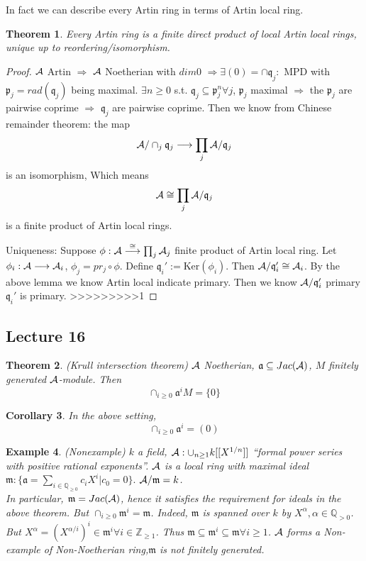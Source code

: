 \documentclass[11pt]{article}
\newtheorem{thm}{Theorem}[section]
\newtheorem{cor}[thm]{Corollary}
\newtheorem{ex}[thm]{Example}
\newcommand{\intg}{\mathbb Z}
\newcommand{\ratl}{\mathbb Q}
\newcommand{\sca}{{\mathfrak a}}
\newcommand{\scm}{{\mathfrak m}}
\newcommand{\scp}{{\mathfrak p}}
\newcommand{\scq}{\mathfrak q}
\newcommand{\cala}{{\cal A}}
\newcommand{\Lrta}{\Longrightarrow}
\newcommand{\lrta}{\longrightarrow}
\begin{document}
In fact we can describe every Artin ring in terms of Artin local ring.
\begin{thm}\label{thm:Artin_product_of_Artin_local}
Every Artin ring is a finite direct product of local Artin local rings, unique up to reordering/isomorphism.
\end{thm}
\begin{proof}
$\cala$ Artin $\Lrta $ $\cala$ Noetherian with $dim 0$ $\Lrta\exists (0)=\cap\scq_j:$ MPD with $\scp_j=rad(\scq_j)$ being maximal. $\exists n\geq 0$  s.t. $\scq_j\subseteq \scp_j^n\forall j$, $\scp_j$ maximal $\Lrta$ the $\scp_j$ are pairwise coprime $\Lrta$ $\scq_j$ are pairwise coprime. Then we know from Chinese remainder theorem:
the map
$$
\cala/\cap_j\scq_j\lrta \prod_j \cala/\scq_j
$$
 is an isomorphism,
 Which means 
 $$
\cala\cong\prod_j \cala/\scq_j
 $$
is a finite product of Artin local rings.

Uniqueness: Suppose $\phi:\cala\overset{\cong}{\lrta}\prod_j\cala_j$ finite product of Artin local ring. Let $\phi_i:\cala\lrta \cala_i$, $\phi_j=pr_j\circ\phi$. Define $\scq_i':=\text{Ker}(\phi_i)$. Then $\cala/\scq'_i\cong \cala_i$. By the above lemma we know Artin local indicate primary. Then we know $\cala/\scq_i'$ primary $\scq_i'$ is primary.
>>>>>>>>>1
\end{proof}

\subsection{Lecture 16}

\begin{thm}\label{thm:Krull_intersection}(Krull intersection theorem)
$\cala$ Noetherian, $\sca\subseteq Jac(\cala)$, $M$ finitely generated $\cala$-module.
Then
$$
\cap_{i\geq 0}\sca^i M=\{0\}
$$
\end{thm}
\begin{cor}
In the above setting, 
$$
\cap_{i\geq 0}\sca^i=(0)
$$
\end{cor}
\begin{ex}
(Nonexample) $k$ a field, $\cala:\cup_{n\geq 1}k[[X^{1/n}]]$ ``formal power series with positive rational exponents''. $\cala$ is a local ring with maximal ideal $\scm:\{\sca=\sum_{i\in\ratl_{\geq 0}}c_i X^i|c_0=0\}.$ $\cala/\scm=k$.\\
In particular, $\scm=Jac(\cala)$, hence it satisfies the requirement for ideals in the above theorem. But $\cap_{i\geq 0}\scm^i=\scm$. Indeed, $\scm$ is spanned over $k$  by $X^\alpha,\alpha\in\ratl_{>0}$. But $X^\alpha=(X^{\alpha/i})^i\in\scm^i\forall i\in\intg_{\geq 1}$. Thus $\scm\subseteq \scm^i\subseteq \scm\forall i\geq 1$. $\cala$ forms a Non-example of Non-Noetherian ring,$\scm$ is not finitely generated. 
\end{ex}
\end{document}
